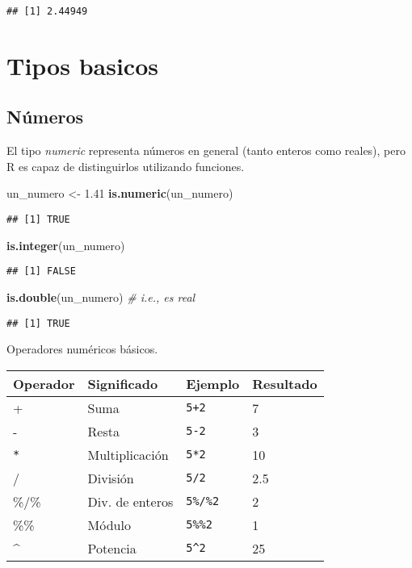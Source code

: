 \documentclass[
]{book}
\newenvironment{Shaded}{\begin{snugshade}}{\end{snugshade}}
\newcommand{\CommentTok}[1]{\textcolor[rgb]{0.56,0.35,0.01}{\textit{#1}}}
\newcommand{\FloatTok}[1]{\textcolor[rgb]{0.00,0.00,0.81}{#1}}
\newcommand{\KeywordTok}[1]{\textcolor[rgb]{0.13,0.29,0.53}{\textbf{#1}}}
\newcommand{\NormalTok}[1]{#1}
\newcommand{\StringTok}[1]{\textcolor[rgb]{0.31,0.60,0.02}{#1}}
\begin{document}
\begin{verbatim}
## [1] 2.44949
\end{verbatim}

\hypertarget{tipos-basicos}{%
\section{Tipos basicos}\label{tipos-basicos}}

\hypertarget{nuxfameros}{%
\subsection{Números}\label{nuxfameros}}

El tipo \emph{numeric} representa números en general (tanto enteros como reales), pero R es capaz de distinguirlos utilizando funciones.

\begin{Shaded}
\begin{Highlighting}[]
\NormalTok{un_numero <-}\StringTok{ }\FloatTok{1.41}
\KeywordTok{is.numeric}\NormalTok{(un_numero)}
\end{Highlighting}
\end{Shaded}

\begin{verbatim}
## [1] TRUE
\end{verbatim}

\begin{Shaded}
\begin{Highlighting}[]
\KeywordTok{is.integer}\NormalTok{(un_numero)}
\end{Highlighting}
\end{Shaded}

\begin{verbatim}
## [1] FALSE
\end{verbatim}

\begin{Shaded}
\begin{Highlighting}[]
\KeywordTok{is.double}\NormalTok{(un_numero) }\CommentTok{# i.e., es real}
\end{Highlighting}
\end{Shaded}

\begin{verbatim}
## [1] TRUE
\end{verbatim}

Operadores numéricos básicos.

\begin{longtable}[]{@{}llll@{}}
\toprule
Operador & Significado & Ejemplo & Resultado\tabularnewline
\midrule
\endhead
+ & Suma & \texttt{5+2} & 7\tabularnewline
- & Resta & \texttt{5-2} & 3\tabularnewline
\texttt{*} & Multiplicación & \texttt{5*2} & 10\tabularnewline
/ & División & \texttt{5/2} & 2.5\tabularnewline
\%/\% & Div. de enteros & \texttt{5\%/\%2} & 2\tabularnewline
\%\% & Módulo & \texttt{5\%\%2} & 1\tabularnewline
\^{} & Potencia & \texttt{5\^{}2} & 25\tabularnewline
\bottomrule
\end{longtable}
\end{document}
